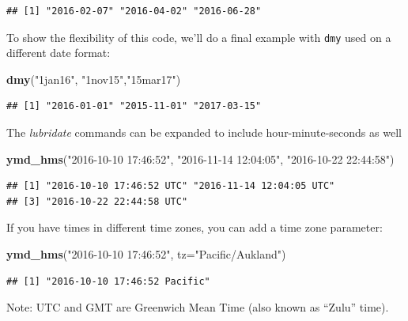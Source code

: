 \documentclass[]{book}
\newenvironment{Shaded}{\begin{snugshade}}{\end{snugshade}}
\newcommand{\KeywordTok}[1]{\textcolor[rgb]{0.13,0.29,0.53}{\textbf{{#1}}}}
\newcommand{\DataTypeTok}[1]{\textcolor[rgb]{0.13,0.29,0.53}{{#1}}}
\newcommand{\StringTok}[1]{\textcolor[rgb]{0.31,0.60,0.02}{{#1}}}
\newcommand{\NormalTok}[1]{{#1}}
\begin{document}
\begin{verbatim}
## [1] "2016-02-07" "2016-04-02" "2016-06-28"
\end{verbatim}

To show the flexibility of this code, we'll do a final example with
\texttt{dmy} used on a different date format:

\begin{Shaded}
\begin{Highlighting}[]
\KeywordTok{dmy}\NormalTok{(}\StringTok{"1jan16"}\NormalTok{, }\StringTok{"1nov15"}\NormalTok{,}\StringTok{"15mar17"}\NormalTok{)}
\end{Highlighting}
\end{Shaded}

\begin{verbatim}
## [1] "2016-01-01" "2015-11-01" "2017-03-15"
\end{verbatim}

The \emph{lubridate} commands can be expanded to include
hour-minute-seconds as well

\begin{Shaded}
\begin{Highlighting}[]
\KeywordTok{ymd_hms}\NormalTok{(}\StringTok{"2016-10-10 17:46:52"}\NormalTok{, }\StringTok{"2016-11-14 12:04:05"}\NormalTok{, }\StringTok{"2016-10-22 22:44:58"}\NormalTok{)}
\end{Highlighting}
\end{Shaded}

\begin{verbatim}
## [1] "2016-10-10 17:46:52 UTC" "2016-11-14 12:04:05 UTC"
## [3] "2016-10-22 22:44:58 UTC"
\end{verbatim}

If you have times in different time zones, you can add a time zone
parameter:

\begin{Shaded}
\begin{Highlighting}[]
\KeywordTok{ymd_hms}\NormalTok{(}\StringTok{"2016-10-10 17:46:52"}\NormalTok{, }\DataTypeTok{tz=}\StringTok{"Pacific/Aukland"}\NormalTok{)}
\end{Highlighting}
\end{Shaded}

\begin{verbatim}
## [1] "2016-10-10 17:46:52 Pacific"
\end{verbatim}

Note: UTC and GMT are Greenwich Mean Time (also known as ``Zulu'' time).
\end{document}
